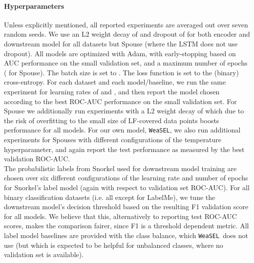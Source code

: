 \documentclass{article}
\newcommand{\weasel}{\texttt{WeaSEL}}\newcommand{\brackets}[1]{\left( #1 \right)}
\begin{document}
\paragraph{Hyperparameters}
Unless explicitly mentioned, all reported experiments are averaged out over seven random seeds.
We use an L2 weight decay of  and dropout of  for both encoder and downstream model for all datasets but Spouse (where the LSTM does not use dropout).
All models are optimized with Adam, with early-stopping based on AUC performance on the small validation set, and a maximum number of  epochs ( for Spouse). The batch size is set to .
The loss function is set to the (binary) cross-entropy.
For each dataset and each model/baseline, we run the same experiment for learning rates of  and , and then report the model chosen according to the best ROC-AUC performance on the small validation set. 
For Spouse we additionally run experiments with a L2 weight decay of  which due to the risk of overfitting to the small size of LF-covered data points boosts performance for all models. 
For our own model, \weasel, we also run additional experiments for Spouses with different configurations of the temperature hyperparameter,  and again report the test performance as measured by the best validation ROC-AUC. \\
The probabilistic labels from Snorkel used for downstream model training are chosen over six different configurations of the learning rate and number of epochs for Snorkel's label model (again with respect to validation set ROC-AUC).
For all binary classification datasets (i.e. all except for LabelMe), we tune the downstream model's decision threshold based on the resulting F1 validation score for all models. We believe that this, alternatively to reporting test ROC-AUC scores, makes the comparison fairer, since F1 is a threshold dependent metric.
All label model baselines are provided with the class balance, which \weasel\ does not use (but which is expected to be helpful for unbalanced classes, where no validation set is available).
\end{document}
